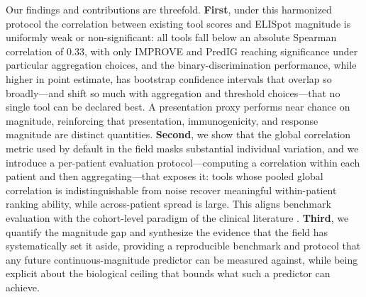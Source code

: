 Our findings and contributions are threefold.
\textbf{First}, under this harmonized protocol the correlation between existing
tool scores and ELISpot magnitude is uniformly weak or non-significant: all tools
fall below an absolute Spearman correlation of $0.33$, with only IMPROVE and
PredIG reaching significance under particular aggregation choices, and the
binary-discrimination performance, while higher in point estimate, has bootstrap
confidence intervals that overlap so broadly---and shift so much with aggregation
and threshold choices---that no single tool can be declared best. A presentation
proxy performs near chance on magnitude, reinforcing that presentation,
immunogenicity, and response magnitude are distinct quantities. \textbf{Second},
we show that the global correlation metric used by default in the field masks
substantial individual variation, and we introduce a per-patient evaluation
protocol---computing a correlation within each patient and then aggregating---that
exposes it: tools whose pooled global correlation is indistinguishable from noise
recover meaningful within-patient ranking ability, while across-patient spread is
large. This aligns benchmark evaluation with the cohort-level paradigm of the
clinical literature \cite{TESLA2020,Muller2023}. \textbf{Third}, we quantify the
magnitude gap and synthesize the evidence that the field has systematically set
it aside, providing a reproducible benchmark and protocol that any future
continuous-magnitude predictor can be measured against, while being explicit
about the biological ceiling that bounds what such a predictor can achieve.
